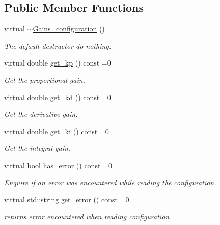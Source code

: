 \subsection*{Public Member Functions}
\begin{DoxyCompactItemize}
\item 
\mbox{\label{classci__example__cpp_1_1Gains__configuration_a14a531c18d485164e218112a1f3bbc39}} 
virtual \hyperlink{classci__example__cpp_1_1Gains__configuration_a14a531c18d485164e218112a1f3bbc39}{$\sim$\+Gains\+\_\+configuration} ()
\begin{DoxyCompactList}\small\item\em The default destructor do nothing. \end{DoxyCompactList}\item 
virtual double \hyperlink{classci__example__cpp_1_1Gains__configuration_add5ce511c797cd688e12cee09d8ec0b8}{get\+\_\+kp} () const =0
\begin{DoxyCompactList}\small\item\em Get the proportional gain. \end{DoxyCompactList}\item 
virtual double \hyperlink{classci__example__cpp_1_1Gains__configuration_a4bc25c0a8283f36366b888feaf15efa9}{get\+\_\+kd} () const =0
\begin{DoxyCompactList}\small\item\em Get the derivative gain. \end{DoxyCompactList}\item 
virtual double \hyperlink{classci__example__cpp_1_1Gains__configuration_a1ac03c97e04ebfbb3c29122e13b0ec0e}{get\+\_\+ki} () const =0
\begin{DoxyCompactList}\small\item\em Get the integral gain. \end{DoxyCompactList}\item 
virtual bool \hyperlink{classci__example__cpp_1_1Gains__configuration_ae075925f60288519f8a4fcb477453a66}{has\+\_\+error} () const =0
\begin{DoxyCompactList}\small\item\em Enquire if an error was encountered while reading the configuration. \end{DoxyCompactList}\item 
virtual std\+::string \hyperlink{classci__example__cpp_1_1Gains__configuration_a886100ef46082d1b9f8ee169318dc554}{get\+\_\+error} () const =0
\begin{DoxyCompactList}\small\item\em returns error encountered when reading configuration \end{DoxyCompactList}\end{DoxyCompactItemize}


